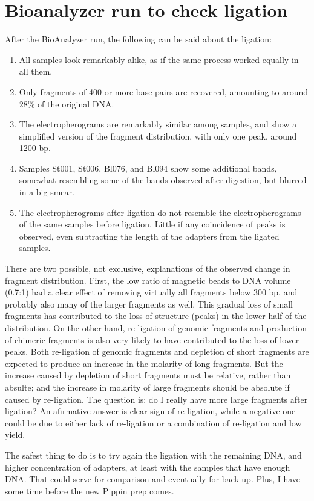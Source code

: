 \documentclass[a4paper,12pt,twosided]{article}
\begin{document}
\section{Bioanalyzer run to check ligation}
After the BioAnalyzer run, the following can be said about the ligation:
\begin{enumerate}
  \item All samples look remarkably alike, as if the same process worked equally in all them.
  \item Only fragments of 400 or more base pairs are recovered, amounting to around 28\% of the original DNA.
  \item The electropherograms are remarkably similar among samples, and show a simplified version of the fragment distribution, with only one peak, around 1200 bp.
  \item Samples St001, St006, Bl076, and Bl094 show some additional bands, somewhat resembling some of the bands observed after digestion, but blurred in a big smear.
  \item The electropherograms after ligation do not resemble the electropherograms of the same samples before ligation. Little if any coincidence of peaks is observed, even subtracting the length of the adapters from the ligated samples.
\end{enumerate}

There are two possible, not exclusive, explanations of the observed change in fragment distribution. First, the low ratio of magnetic beads to DNA volume (0.7:1) had a clear effect of removing virtually all fragments below 300 bp, and probably also many of the larger fragments as well. This gradual loss of small fragments has contributed to the loss of structure (peaks) in the lower half of the distribution. On the other hand, re-ligation of genomic fragments and production of chimeric fragments is also very likely to have contributed to the loss of lower peaks. Both re-ligation of genomic fragments and depletion of short fragments are expected to produce an increase in the molarity of long fragments. But the increase caused by depletion of short fragments must be relative, rather than absulte; and the increase in molarity of large fragments should be absolute if caused by re-ligation. The question is: do I really have more large fragments after ligation? An afirmative answer is clear sign of re-ligation, while a negative one could be due to either lack of re-ligation or a combination of re-ligation and low yield.

The safest thing to do is to try again the ligation with the remaining DNA, and higher concentration of adapters, at least with the samples that have enough DNA. That could serve for comparison and eventually for back up. Plus, I have some time before the new Pippin prep comes.
\end{document}
